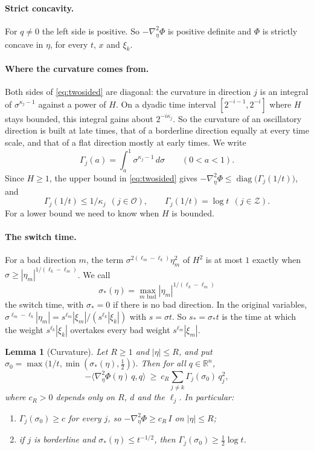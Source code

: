 \documentclass[11pt]{article}
\newtheorem{lemma}[theorem]{Lemma}
\theoremstyle{remark}
\newcommand{\R}{\mathbb{R}}
\begin{document}
\paragraph{Strict concavity.} For $q\ne0$ the left side is positive. So
$-\nabla_\eta^2\Phi$ is positive definite and $\Phi$ is strictly concave in $\eta$,
for every $t$, $x$ and $\xi_k$.

\paragraph{Where the curvature comes from.} Both sides of \eqref{eq:twosided} are
diagonal: the curvature in direction $j$ is an integral of $\sigma^{\kappa_j-1}$
against a power of $H$. On a dyadic time interval $[2^{-i-1},2^{-i}]$ where $H$
stays bounded, this integral gains about $2^{-i\kappa_j}$. So the curvature of an
oscillatory direction is built at late times, that of a borderline direction equally
at every time scale, and that of a flat direction mostly at early times. We write
\[
\Gamma_j(a)=\int_a^1\sigma^{\kappa_j-1}\,d\sigma\qquad(0<a<1).
\]
Since $H\ge1$, the upper bound in \eqref{eq:twosided} gives
$-\nabla_\eta^2\Phi\le\operatorname{diag}\big(\Gamma_j(1/t)\big)$, and
\begin{equation}\label{eq:Gamma-upper}
\Gamma_j(1/t)\le1/\kappa_j\ \ (j\in\mathcal O),\qquad
\Gamma_j(1/t)=\log t\ \ (j\in\mathcal Z).
\end{equation}
For a lower bound we need to know when $H$ is bounded.

\paragraph{The switch time.} For a bad direction $m$, the term
$\sigma^{2(\ell_m-\ell_k)}\eta_m^2$ of $H^2$ is at most $1$ exactly when
$\sigma\ge|\eta_m|^{1/(\ell_k-\ell_m)}$. We call
\[
\sigma_*(\eta)=\max_{m\text{ bad}}|\eta_m|^{1/(\ell_k-\ell_m)}
\]
the switch time, with $\sigma_*=0$ if there is no bad direction. In the original
variables, $\sigma^{\ell_m-\ell_k}|\eta_m|=s^{\ell_m}|\xi_m|/(s^{\ell_k}|\xi_k|)$ with
$s=\sigma t$. So $s_*=\sigma_*t$ is the time at which the weight $s^{\ell_k}|\xi_k|$
overtakes every bad weight $s^{\ell_m}|\xi_m|$.

\begin{lemma}[Curvature]\label{lem:curv}
	Let $R\ge1$ and $|\eta|\le R$, and put
	$\sigma_0=\max\big(1/t,\min(\sigma_*(\eta),\tfrac12)\big)$. Then for all $q\in\R^n$,
	\[
	-\langle\nabla_\eta^2\Phi(\eta)\,q,q\rangle\ \ge\ c_R\sum_{j\ne k}\Gamma_j(\sigma_0)\,q_j^2,
	\]
	where $c_R>0$ depends only on $R$, $d$ and the $\ell_j$. In particular:
	\begin{enumerate}
		\item[(i)] $\Gamma_j(\sigma_0)\ge c$ for every $j$, so $-\nabla_\eta^2\Phi\ge c_R\,I$
		on $|\eta|\le R$;
		\item[(ii)] if $j$ is borderline and $\sigma_*(\eta)\le t^{-1/2}$, then
		$\Gamma_j(\sigma_0)\ge\frac12\log t$.
	\end{enumerate}
\end{lemma}
\end{document}
